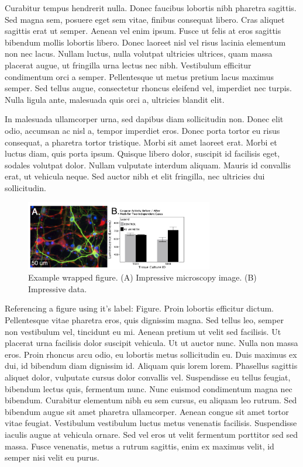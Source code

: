 \documentclass[11pt, notitlepage]{article} %
\begin{document}
Curabitur tempus hendrerit nulla. Donec faucibus lobortis nibh pharetra sagittis. Sed magna sem, posuere eget sem vitae, finibus consequat libero. Cras aliquet sagittis erat ut semper. Aenean vel enim ipsum. Fusce ut felis at eros sagittis bibendum mollis lobortis libero. Donec laoreet nisl vel risus lacinia elementum non nec lacus. Nullam luctus, nulla volutpat ultricies ultrices, quam massa placerat augue, ut fringilla urna lectus nec nibh. Vestibulum efficitur condimentum orci a semper. Pellentesque ut metus pretium lacus maximus semper. Sed tellus augue, consectetur rhoncus eleifend vel, imperdiet nec turpis. Nulla ligula ante, malesuada quis orci a, ultricies blandit elit.

In malesuada ullamcorper urna, sed dapibus diam sollicitudin non. Donec elit odio, accumsan ac nisl a, tempor imperdiet eros. Donec porta tortor eu risus consequat, a pharetra tortor tristique. Morbi sit amet laoreet erat. Morbi et luctus diam, quis porta ipsum. Quisque libero dolor, suscipit id facilisis eget, sodales volutpat dolor. Nullam vulputate interdum aliquam. Mauris id convallis erat, ut vehicula neque. Sed auctor nibh et elit fringilla, nec ultricies dui sollicitudin.

\begin{figure}\label{fig:example} %
	\includegraphics[width=8.2cm]{Figures/Fig1.jpg}
	\caption{\footnotesize Example wrapped figure. (A) Impressive microscopy image. (B) Impressive data.}	
\end{figure}

Referencing a figure using it's label: Figure. Proin lobortis efficitur dictum. Pellentesque vitae pharetra eros, quis dignissim magna. Sed tellus leo, semper non vestibulum vel, tincidunt eu mi. Aenean pretium ut velit sed facilisis. Ut placerat urna facilisis dolor suscipit vehicula. Ut ut auctor nunc. Nulla non massa eros. Proin rhoncus arcu odio, eu lobortis metus sollicitudin eu. Duis maximus ex dui, id bibendum diam dignissim id. Aliquam quis lorem lorem. Phasellus sagittis aliquet dolor, vulputate cursus dolor convallis vel. Suspendisse eu tellus feugiat, bibendum lectus quis, fermentum nunc. Nunc euismod condimentum magna nec bibendum. Curabitur elementum nibh eu sem cursus, eu aliquam leo rutrum. Sed bibendum augue sit amet pharetra ullamcorper. Aenean congue sit amet tortor vitae feugiat. Vestibulum vestibulum luctus metus venenatis facilisis. Suspendisse iaculis augue at vehicula ornare. Sed vel eros ut velit fermentum porttitor sed sed massa. Fusce venenatis, metus a rutrum sagittis, enim ex maximus velit, id semper nisi velit eu purus.
\end{document}
